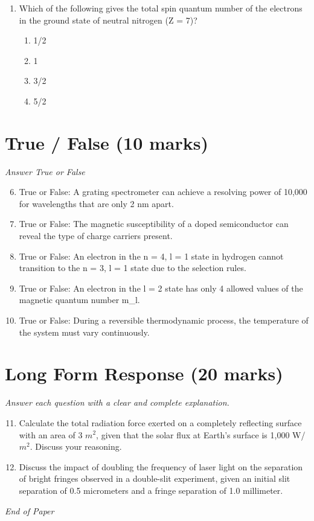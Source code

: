 \documentclass[12pt]{article}
\begin{document}
\begin{enumerate}[label=\arabic*.]
\begin{enumerate}[label=(\alph*)]
    \item an excimer laser
    \item a ruby laser
\end{enumerate}
\item Which of the following gives the total spin quantum number of the electrons in the ground state of neutral nitrogen (Z = 7)?
\begin{enumerate}[label=(\alph*)]
    \item 1/2
    \item 1
    \item 3/2
    \item 5/2
\end{enumerate}
\end{enumerate}

\section*{True / False (10 marks)}
\textit{Answer True or False}
\begin{enumerate}[label=\arabic*.]
\setcounter{enumi}{5}
\item True or False: A grating spectrometer can achieve a resolving power of 10,000 for wavelengths that are only 2 nm apart.
\item True or False: The magnetic susceptibility of a doped semiconductor can reveal the type of charge carriers present.
\item True or False: An electron in the n = 4, l = 1 state in hydrogen cannot transition to the n = 3, l = 1 state due to the selection rules.
\item True or False: An electron in the l = 2 state has only 4 allowed values of the magnetic quantum number m\_l.
\item True or False: During a reversible thermodynamic process, the temperature of the system must vary continuously.
\end{enumerate}

\section*{Long Form Response (20 marks)}
\textit{Answer each question with a clear and complete explanation.}
\begin{enumerate}[label=\arabic*.]
\setcounter{enumi}{10}
\item Calculate the total radiation force exerted on a completely reflecting surface with an area of 3 $m^2$, given that the solar flux at Earth's surface is 1,000 W/$m^2$. Discuss your reasoning.
\item Discuss the impact of doubling the frequency of laser light on the separation of bright fringes observed in a double-slit experiment, given an initial slit separation of 0.5 micrometers and a fringe separation of 1.0 millimeter.
\end{enumerate}

\vfill
\noindent\textit{End of Paper}
\end{document}
